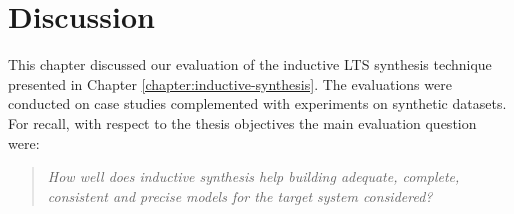 \section{Discussion\label{section:evaluation-summary}}

This chapter discussed our evaluation of the inductive LTS synthesis technique presented in Chapter \ref{chapter:inductive-synthesis}. The evaluations were conducted on case studies complemented with experiments on synthetic datasets. For recall, with respect to the thesis objectives the main evaluation question were:

\begin{quotation}
\emph{How well does inductive synthesis help building \emph{adequate}, \emph{complete}, \emph{consistent} and \emph{precise} models for the target system considered?}
\end{quotation}

